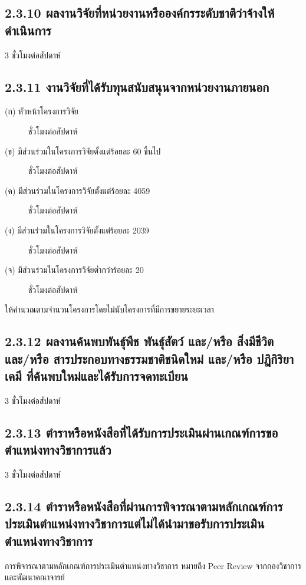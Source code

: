 \documentclass[a4paper,12pt,english]{sphinxmanual}
\begin{document}
\subsection{2.3.10 ผลงานวิจัยที่หน่วยงานหรือองค์กรระดับชาติว่าจ้างให้ดำเนินการ}
\label{\detokenize{2research:id20}}
3 ชั่วโมงต่อสัปดาห์


\subsection{2.3.11 งานวิจัยที่ได้รับทุนสนับสนุนจากหน่วยงานภายนอก}
\label{\detokenize{2research:id21}}\begin{description}
\item[{(ก) หัวหน้าโครงการวิจัย}]  ชั่วโมงต่อสัปดาห์

\item[{(ข) มีส่วนร่วมในโครงการวิจัยตั้งแต่ร้อยละ 60 ขึ้นไป}]  ชั่วโมงต่อสัปดาห์

\item[{(ค) มีส่วนร่วมในโครงการวิจัยตั้งแต่ร้อยละ 40\sphinxhyphen{}59}]  ชั่วโมงต่อสัปดาห์

\item[{(ง) มีส่วนร่วมในโครงการวิจัยตั้งแต่ร้อยละ 20\sphinxhyphen{}39}]  ชั่วโมงต่อสัปดาห์

\item[{(จ) มีส่วนร่วมในโครงการวิจัยต่ำกว่าร้อยละ 20}]  ชั่วโมงต่อสัปดาห์

\end{description}

ให้คำนวณตามจำนวนโครงการโดยไม่นับโครงการที่มีการขยายระยะเวลา


\subsection{2.3.12 ผลงานค้นพบพันธุ์พืช พันธุ์สัตว์ และ/หรือ สิ่งมีชีวิต และ/หรือ สารประกอบทางธรรมชาติชนิดใหม่ และ/หรือ ปฏิกิริยาเคมี ที่ค้นพบใหม่และได้รับการจดทะเบียน}
\label{\detokenize{2research:id22}}
3 ชั่วโมงต่อสัปดาห์


\subsection{2.3.13 ตำราหรือหนังสือที่ได้รับการประเมินผ่านเกณฑ์การขอตำแหน่งทางวิชาการแล้ว}
\label{\detokenize{2research:id23}}
3 ชั่วโมงต่อสัปดาห์


\subsection{2.3.14 ตำราหรือหนังสือที่ผ่านการพิจารณาตามหลักเกณฑ์การประเมินตำแหน่งทางวิชาการแต่ไม่ได้นำมาขอรับการประเมินตำแหน่งทางวิชาการ}
\label{\detokenize{2research:id24}}
การพิจารณาตามหลักเกณฑ์การประเมินตำแหน่งทางวิชาการ หมายถึง Peer Review จากกองวิชาการและพัฒนาคณาจารย์
\end{document}
